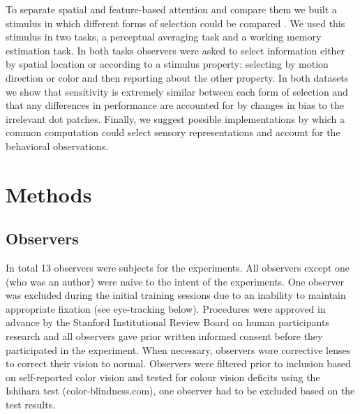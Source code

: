 To separate spatial and feature-based attention and compare them we built a stimulus in which different forms of selection could be compared \citep{Saenz2003-qz}. We used this stimulus in two tasks, a perceptual averaging task and a working memory estimation task. In both tasks observers were asked to select information either by spatial location or according to a stimulus property: selecting by motion direction or color and then reporting about the other property. In both datasets we show that sensitivity is extremely similar between each form of selection and that any differences in performance are accounted for by changes in bias to the irrelevant dot patches. Finally, we suggest possible implementations by which a common computation could select sensory representations and account for the behavioral observations. 

\section{Methods}

\subsection{Observers}
In total 13 observers were subjects for the experiments. All observers except one (who was an author) were naive to the intent of the experiments. One observer was excluded during the initial training sessions due to an inability to maintain appropriate fixation (see eye-tracking below). Procedures were approved in advance by the Stanford Institutional Review Board on human participants research and all observers gave prior written informed consent before they participated in the experiment. When necessary, observers wore corrective lenses to correct their vision to normal. Observers were filtered prior to inclusion based on self-reported color vision and tested for colour vision deficits using the Ishihara test (color-blindness.com), one observer had to be excluded based on the test results. 

